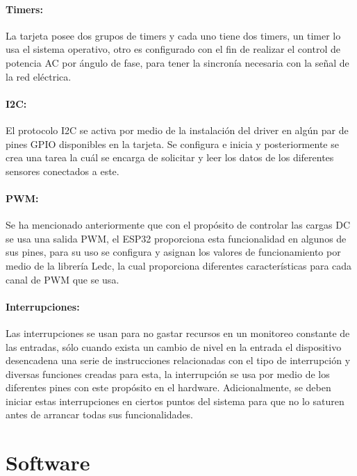 \paragraph{Timers:}

La tarjeta posee dos grupos de timers y cada uno tiene dos timers, un timer lo usa el sistema operativo, otro es configurado con el fin de realizar el control de potencia AC por ángulo de fase, para tener la sincronía necesaria con la señal de la red eléctrica.

\paragraph{I2C:}

El protocolo I2C se activa por medio de la instalación del driver en algún par de pines GPIO disponibles en la tarjeta. Se configura e inicia y posteriormente se crea una tarea la cuál se encarga de solicitar y leer los datos de los diferentes sensores conectados a este.

\paragraph{PWM:}

Se ha mencionado anteriormente que con el propósito de controlar las cargas DC se usa una salida PWM, el ESP32 proporciona esta funcionalidad en algunos de sus pines, para su uso se configura y asignan los valores de funcionamiento por medio de la librería Ledc, la cual proporciona diferentes características para cada canal de PWM que se usa.

\paragraph{Interrupciones:}

Las interrupciones se usan para no gastar recursos en un monitoreo constante de las entradas, sólo cuando exista un cambio de nivel en la entrada el dispositivo desencadena una serie de instrucciones relacionadas con el tipo de interrupción y diversas funciones creadas para esta, la interrupción se usa por medio de los diferentes pines con este propósito en el hardware. Adicionalmente, se deben iniciar estas interrupciones en ciertos puntos del sistema para que no lo saturen antes de arrancar todas sus funcionalidades.

\section{Software}

